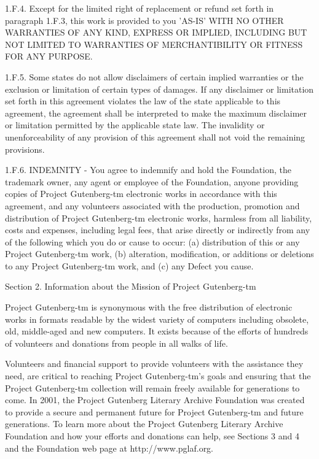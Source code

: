 \documentclass[twocolumn]{article}
\begin{document}
1.F.4.  Except for the limited right of replacement or refund set forth
in paragraph 1.F.3, this work is provided to you 'AS-IS' WITH NO OTHER
WARRANTIES OF ANY KIND, EXPRESS OR IMPLIED, INCLUDING BUT NOT LIMITED TO
WARRANTIES OF MERCHANTIBILITY OR FITNESS FOR ANY PURPOSE.

1.F.5.  Some states do not allow disclaimers of certain implied
warranties or the exclusion or limitation of certain types of damages.
If any disclaimer or limitation set forth in this agreement violates the
law of the state applicable to this agreement, the agreement shall be
interpreted to make the maximum disclaimer or limitation permitted by
the applicable state law.  The invalidity or unenforceability of any
provision of this agreement shall not void the remaining provisions.

1.F.6.  INDEMNITY - You agree to indemnify and hold the Foundation, the
trademark owner, any agent or employee of the Foundation, anyone
providing copies of Project Gutenberg-tm electronic works in accordance
with this agreement, and any volunteers associated with the production,
promotion and distribution of Project Gutenberg-tm electronic works,
harmless from all liability, costs and expenses, including legal fees,
that arise directly or indirectly from any of the following which you do
or cause to occur: (a) distribution of this or any Project Gutenberg-tm
work, (b) alteration, modification, or additions or deletions to any
Project Gutenberg-tm work, and (c) any Defect you cause.


Section  2.  Information about the Mission of Project Gutenberg-tm

Project Gutenberg-tm is synonymous with the free distribution of
electronic works in formats readable by the widest variety of computers
including obsolete, old, middle-aged and new computers.  It exists
because of the efforts of hundreds of volunteers and donations from
people in all walks of life.

Volunteers and financial support to provide volunteers with the
assistance they need, are critical to reaching Project Gutenberg-tm's
goals and ensuring that the Project Gutenberg-tm collection will
remain freely available for generations to come.  In 2001, the Project
Gutenberg Literary Archive Foundation was created to provide a secure
and permanent future for Project Gutenberg-tm and future generations.
To learn more about the Project Gutenberg Literary Archive Foundation
and how your efforts and donations can help, see Sections 3 and 4
and the Foundation web page at http://www.pglaf.org.
\end{document}
